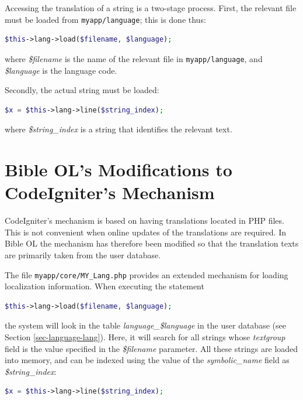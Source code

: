 \documentclass[11pt,oneside,a4paper]{memoir}
\begin{document}
Accessing the translation of a string is a two-stage process. First, the relevant file must be loaded
from \texttt{myapp/language}; this is done thus:

\begin{lstlisting}[language=PHP]
$this->lang->load($filename, $language);
\end{lstlisting}

\noindent
where \emph{\$filename} is the name of the relevant file in \texttt{myapp/language}, and
\emph{\$language} is the language code.

Secondly, the actual string must be loaded:

\begin{lstlisting}[language=PHP]
$x = $this->lang->line($string_index);
\end{lstlisting}

\noindent
where \emph{\$string\_index} is a string that identifies the relevant text.



\section{Bible OL's Modifications to CodeIgniter's Mechanism}\label{sec-loc-user-interface}

CodeIgniter's mechanism is based on having translations located in PHP files. This is not convenient
when online updates of the translations are required. In Bible OL the mechanism has therefore been modified
so that the translation texts are primarily taken from the user database.

The file \texttt{myapp/core/MY\_Lang.php} provides an extended mechanism for loading localization
information. When executing the statement

\begin{lstlisting}[language=PHP]
$this->lang->load($filename, $language);
\end{lstlisting}

\noindent
the system will look in the table \emph{language\_\$language} in the user database (see Section
\ref{sec-language-lang}). Here, it will search for all strings whose \emph{textgroup} field is the
value specified in the \emph{\$filename} parameter. All these strings are loaded into memory, and
can be indexed using the value of the \emph{symbolic\_name} field as \emph{\$string\_index}:


\begin{lstlisting}[language=PHP]
$x = $this->lang->line($string_index);
\end{lstlisting}
\end{document}
